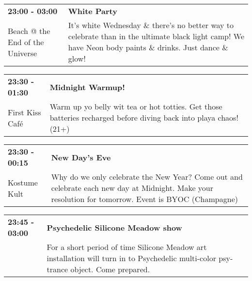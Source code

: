 \begin{tabular}{ p{1in} p{2.2in} }
    \textbf{23:00 - 03:00} & \textbf{White Party} \\
    Beach @ the End of the Universe \newline  & It's white Wednesday \& there's no better way to celebrate than in the ultimate black light camp! We have Neon body paints \& drinks. Just dance \& glow! \\
    \hline 
\end{tabular}
    
\begin{tabular}{ p{1in} p{2.2in} }
    \textbf{23:30 - 01:30} & \textbf{Midnight Warmup!} \\
    First Kiss Caf\'e \newline  & Warm up yo belly wit tea or hot totties.  Get those batteries recharged before diving back into playa chaos! (21+) \\
    \hline 
\end{tabular}
    
\begin{tabular}{ p{1in} p{2.2in} }
    \textbf{23:30 - 00:15} & \textbf{New Day's Eve} \\
    Kostume Kult \newline  & Why do we only celebrate the New Year?  Come out and celebrate each new day at Midnight. Make your resolution for tomorrow.  Event is BYOC (Champagne) \\
    \hline 
\end{tabular}
    
\begin{tabular}{ p{1in} p{2.2in} }
    \textbf{23:45 - 03:00} & \textbf{Psychedelic Silicone Meadow show} \\
    ~ \newline  & For a short period of time Silicone Meadow art installation will turn in to Psychedelic multi-color psy-trance object. Come prepared. \\
    \hline 
\end{tabular}
    

